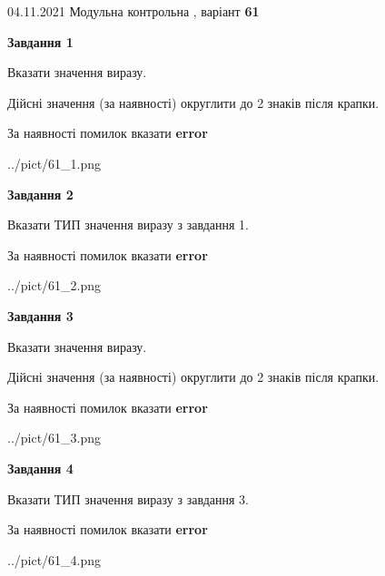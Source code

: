 \documentclass[11pt, ukrainian]{article}
\begin{document}
{04.11.2021 Модульна контрольна , варіант  \No \textbf { 61 }\par}
{
\begin {large}
{\begin {center}\textbf{Завдання 1}\end {center}}\par
Вказати значення виразу. \par
Дійсні значення (за наявності) округлити до 2 знаків після крапки. \par
За наявності помилок вказати \textbf{error}

\begin{center}
	{../pict/61_1.png}
\end{center}
\newpage

{\begin {center}\textbf{Завдання 2}\end {center}}\par
Вказати ТИП значення виразу з завдання 1. \par
За наявності помилок вказати \textbf{error}

\begin{center}
	{../pict/61_2.png}
\end{center}
\newpage

{\begin {center}\textbf{Завдання 3}\end {center}}\par
Вказати значення виразу. \par
Дійсні значення (за наявності) округлити до 2 знаків після крапки. \par
За наявності помилок вказати \textbf{error}

\begin{center}
	{../pict/61_3.png}
\end{center}
\newpage

{\begin {center}\textbf{Завдання 4}\end {center}}\par
Вказати ТИП значення виразу з завдання 3. \par
За наявності помилок вказати \textbf{error}

\begin{center}
	{../pict/61_4.png}
\end{center}
\newpage


\end{large}}
\end{document}
